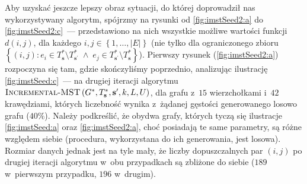 Aby uzyskać jeszcze lepszy obraz sytuacji, do której doprowadził nas wykorzystywany algorytm, spójrzmy na rysunki od \ref{fig:imstSeed2:a} do \ref{fig:imstSeed2:c}~--- przedstawiono na nich wszystkie możliwe wartości funkcji $d \left( i, j \right)$, dla każdego $i, j \in \left\{ 1, \dots, \left| E \right| \right\}$ (nie tylko dla ograniczonego zbioru $\left\{ \left( i, j \right) : e_{i} \in T^{\ast}_{\textbf{s}} \setminus T^{\ast}_{\textbf{s}^{\prime}} \; \wedge \; e_{j} \in T^{\ast}_{\textbf{s}^{\prime}} \setminus T^{\ast}_{\textbf{s}} \right\}$).
Pierwszy rysunek (\ref{fig:imstSeed2:a}) rozpoczyna się tam, gdzie skończyliśmy poprzednio, analizując ilustrację \ref{fig:imstSeed:c}~--- na drugiej iteracji algorytmu $\textsc{Incremental-MST} \left( G^{\ast}, T^{\ast}_{\textbf{s}}, \textbf{s}^{\prime}, k, L, U \right)$, dla grafu z~$15$ wierzchołkami i~$42$ krawędziami, których liczebność wynika z~żądanej gęstości generowanego losowo grafu ($40\%$).
Należy podkreślić, że obydwa grafy, których tyczą się ilustracje \ref{fig:imstSeed:a} oraz \ref{fig:imstSeed2:a}, choć posiadają te same parametry, są różne względem siebie (procedura, wykorzystana do ich generowania, jest losowa).
Rozmiar danych jednak jest na tyle mały, że liczby dopuszczalnych par $\left( i, j \right)$ po drugiej iteracji algorytmu w~obu przypadkach są zbliżone do siebie ($189$ w~pierwszym przypadku, $196$ w~drugim).


